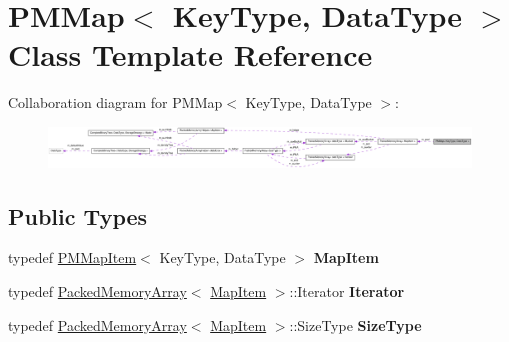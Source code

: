 \hypertarget{class_p_m_map}{
\section{PMMap$<$ KeyType, DataType $>$ Class Template Reference}
\label{class_p_m_map}
}


Collaboration diagram for PMMap$<$ KeyType, DataType $>$:\nopagebreak
\begin{figure}[H]
\begin{center}
\leavevmode
\includegraphics[width=400pt]{class_p_m_map__coll__graph}
\end{center}
\end{figure}
\subsection*{Public Types}
\begin{DoxyCompactItemize}
\item 
\hypertarget{class_p_m_map_a3ab69ef3061353c64e9f1a7b966132cb}{
typedef \hyperlink{class_p_m_map_item}{PMMapItem}$<$ KeyType, DataType $>$ {\bfseries MapItem}}
\label{class_p_m_map_a3ab69ef3061353c64e9f1a7b966132cb}

\item 
\hypertarget{class_p_m_map_ad76e16883c792d57e2ac0d05159b0c83}{
typedef \hyperlink{class_packed_memory_array}{PackedMemoryArray}$<$ \hyperlink{class_p_m_map_item}{MapItem} $>$::Iterator {\bfseries Iterator}}
\label{class_p_m_map_ad76e16883c792d57e2ac0d05159b0c83}

\item 
\hypertarget{class_p_m_map_a02fbc500c26d1e9eafecf8f48e2f8a88}{
typedef \hyperlink{class_packed_memory_array}{PackedMemoryArray}$<$ \hyperlink{class_p_m_map_item}{MapItem} $>$::SizeType {\bfseries SizeType}}
\label{class_p_m_map_a02fbc500c26d1e9eafecf8f48e2f8a88}

\end{DoxyCompactItemize}
